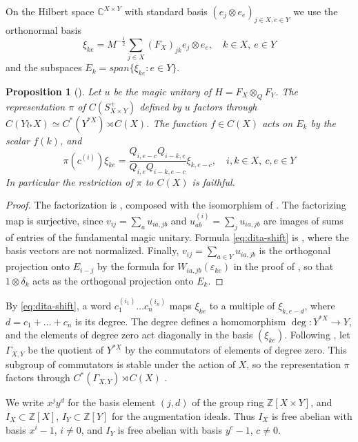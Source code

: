 \documentclass[11pt,reqno]{amsart}
\newtheorem{prop}[thm]{Proposition}
\theoremstyle{definition}
\numberwithin{equation}{section}
\begin{document}
On the Hilbert space $\mathbb C^{X\times Y}$ with standard basis $(e_j\otimes e_e)_{j\in X,e\in Y}$ we use the orthonormal basis
$$\xi_{ke}=M^{-\frac12}\sum_{j\in X}(F_X)_{jk}e_j\otimes e_e,
\quad k\in X,\ e\in Y$$
and the subspaces $E_k=span\{\xi_{ke}:e\in Y\}$.

\begin{prop}[\cite{BBi15}]\label{prop:dita-block}
Let $u$ be the magic unitary of $H=F_X\otimes_Q F_Y$. The representation $\pi$ of $C(S_{X\times Y}^+)$ defined by $u$ factors through $C(Y \wr_* X)\simeq C^*(Y^{*X})\rtimes C(X)$. The function $f\in C(X)$ acts on $E_k$ by the scalar $f(k)$, and
\begin{equation}\label{eq:dita-shift}
\pi(c^{(i)})\xi_{ke}
=\frac{Q_{i,e-c}Q_{i-k,e}}{Q_{i,e}Q_{i-k,e-c}}\xi_{k,e-c},
\quad i,k\in X,\ c,e\in Y
\end{equation}
In particular the restriction of $\pi$ to $C(X)$ is faithful.
\end{prop}
\begin{proof}
The factorization is \cite[Proposition 3.6]{BBi15}, composed with the isomorphism of \cite[Lemma 3.8]{BBi15}. The factorizing map is surjective, since $v_{ij}=\sum_au_{ia,jb}$ and $u^{(i)}_{ab}=\sum_ju_{ia,jb}$ are images of sums of entries of the fundamental magic unitary. Formula \eqref{eq:dita-shift} is \cite[Lemma 3.9]{BBi15}, where the basis vectors are not normalized. Finally, $v_{ij}=\sum_{a\in Y}u_{ia,jb}$ is the orthogonal projection onto $E_{i-j}$ by the formula for $W_{ia,jb}(\varepsilon_{ke})$ in the proof of \cite[Lemma 3.9]{BBi15}, so that $1\otimes\delta_k$ acts as the orthogonal projection onto $E_k$.
\end{proof}

By \eqref{eq:dita-shift}, a word $c_1^{(i_1)}\ldots c_n^{(i_n)}$ maps $\xi_{ke}$ to a multiple of $\xi_{k,e-d}$, where $d=c_1+\ldots+c_n$ is its degree. The degree defines a homomorphism $\deg:Y^{*X}\to Y$, and the elements of degree zero act diagonally in the basis $(\xi_{ke})$. Following \cite[Theorem 3.10]{BBi15}, let $\Gamma_{X,Y}$ be the quotient of $Y^{*X}$ by the commutators of elements of degree zero. This subgroup of commutators is stable under the action of $X$, so the representation $\pi$ factors through $C^*(\Gamma_{X,Y})\rtimes C(X)$ \cite[Theorem 3.10]{BBi15}.

We write $x^jy^d$ for the basis element $(j,d)$ of the group ring $\mathbb Z[X\times Y]$, and $I_X\subset\mathbb Z[X]$, $I_Y\subset\mathbb Z[Y]$ for the augmentation ideals. Thus $I_X$ is free abelian with basis $x^i-1$, $i\neq0$, and $I_Y$ is free abelian with basis $y^c-1$, $c\neq0$.
\end{document}
